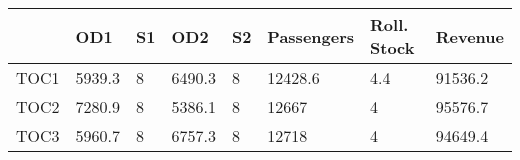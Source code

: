 \begin{tabular}{llllllll}
& OD1 & S1 & OD2 & S2 & Passengers & Roll. Stock & Revenue \\ 
\hline 
TOC1 & 5939.3 & 8 & 6490.3 & 8 & 12428.6 & 4.4 & 91536.2 \\ 
TOC2 & 7280.9 & 8 & 5386.1 & 8 & 12667 & 4 & 95576.7 \\ 
TOC3 & 5960.7 & 8 & 6757.3 & 8 & 12718 & 4 & 94649.4 \\ 
\hline 
\end{tabular}